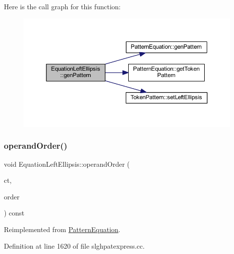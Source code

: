 Here is the call graph for this function\+:
\nopagebreak
\begin{figure}[H]
\begin{center}
\leavevmode
\includegraphics[width=350pt]{class_equation_left_ellipsis_a8d2e9982b85b000ff611204134a01061_cgraph}
\end{center}
\end{figure}
\mbox{\label{class_equation_left_ellipsis_a661203e5beadef3033ac3112353e012b}} 
\subsubsection{\texorpdfstring{operandOrder()}{operandOrder()}}
{\footnotesize\ttfamily void Equation\+Left\+Ellipsis\+::operand\+Order (\begin{DoxyParamCaption}\item[{\mbox{\hyperlink{class_constructor}{Constructor}} $\ast$}]{ct,  }\item[{vector$<$ \mbox{\hyperlink{class_operand_symbol}{Operand\+Symbol}} $\ast$ $>$ \&}]{order }\end{DoxyParamCaption}) const\hspace{0.3cm}{\ttfamily [virtual]}}



Reimplemented from \mbox{\hyperlink{class_pattern_equation_a944d7114e5d5b6876352e555cc060829}{Pattern\+Equation}}.



Definition at line 1620 of file slghpatexpress.\+cc.


